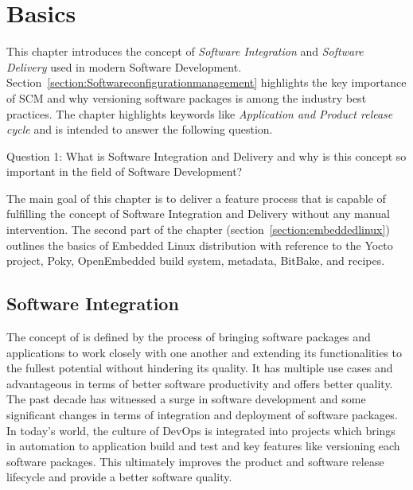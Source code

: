 
\chapter{Basics} %

\label{Chapter2} %

This chapter introduces the concept of \emph{Software Integration} and \emph{Software Delivery} used in modern Software Development. Section~\ref{section:Softwareconfigurationmanagement} highlights the key importance of \ac{SCM} and why versioning software packages is among the industry best practices. The chapter highlights keywords like \emph{Application and Product release cycle} and is intended to
answer the following question.

\vspace{0.5cm}
\noindent Question 1: What is Software Integration and Delivery and why is this concept so important in the field of Software Development?
\vspace{0.5cm}


\noindent The main goal of this chapter is to deliver a feature process that is capable of fulfilling the concept of Software Integration and Delivery without any manual intervention. The second part of the chapter (section~\ref{section:embeddedlinux}) outlines the basics of Embedded Linux distribution with reference to the Yocto project, Poky, OpenEmbedded build system, metadata, BitBake, and recipes. 

\section{Software Integration}\label{section:SoftwareIntegration}
The concept of  is defined by the process of bringing software packages and applications to work closely with one another and extending its functionalities to the fullest potential without hindering its quality. It has multiple use cases and advantageous in terms of better software productivity and offers better quality. The past decade has witnessed a surge in software development and some significant changes in terms of integration and deployment of software packages. In today’s world, the culture of DevOps is integrated into projects which brings in automation to application build and test and key features like versioning each software packages. This ultimately improves the product and software release lifecycle and provide a better software quality.    

